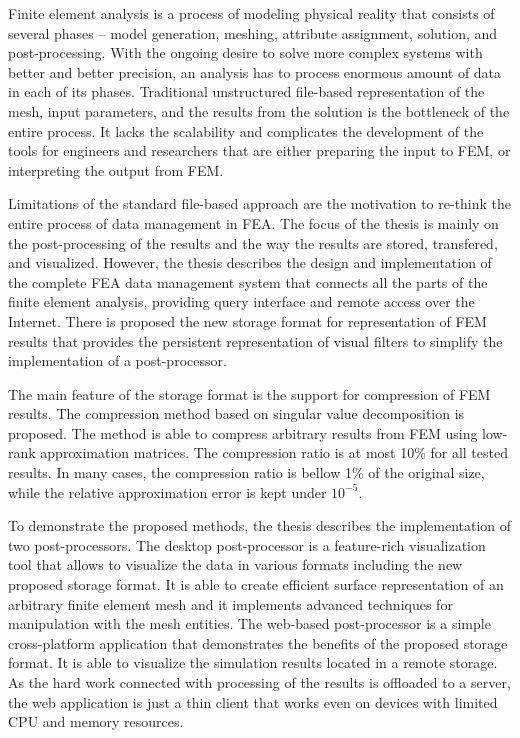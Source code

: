 \noindent
Finite element analysis is a process of modeling physical reality that consists of several phases -- model generation, meshing, attribute assignment, solution, and post-processing. With the ongoing desire to solve more complex systems with better and better precision, an analysis has to process enormous amount of data in each of its phases. Traditional unstructured file-based representation of the mesh, input parameters, and the results from the solution is the bottleneck of the entire process. It lacks the scalability and complicates the development of the tools for engineers and researchers that are either preparing the input to FEM, or interpreting the output from FEM.

Limitations of the standard file-based approach are the motivation to re-think the entire process of data management in FEA. The focus of the thesis is mainly on the post-processing of the results and the way the results are stored, transfered, and visualized. However, the thesis describes the design and implementation of the complete FEA data management system that connects all the parts of the finite element analysis, providing query interface and remote access over the Internet. There is proposed the new storage format for representation of FEM results that provides the persistent representation of visual filters to simplify the implementation of a post-processor.

The main feature of the storage format is the support for compression of FEM results. The compression method based on singular value decomposition is proposed. The method is able to compress arbitrary results from FEM using low-rank approximation matrices. The compression ratio is at most 10\% for all tested results. In many cases, the compression ratio is bellow 1\% of the original size, while the relative approximation error is kept under $10^{-5}$.

To demonstrate the proposed methods, the thesis describes the implementation of two post-processors. The desktop post-processor is a feature-rich visualization tool that allows to visualize the data in various formats including the new proposed storage format. It is able to create efficient surface representation of an arbitrary finite element mesh and it implements advanced techniques for manipulation with the mesh entities. The web-based post-processor is a simple cross-platform application that demonstrates the benefits of the proposed storage format. It is able to visualize the simulation results located in a remote storage. As the hard work connected with processing of the results is offloaded to a server, the web application is just a thin client that works even on devices with limited CPU and memory resources.\\
